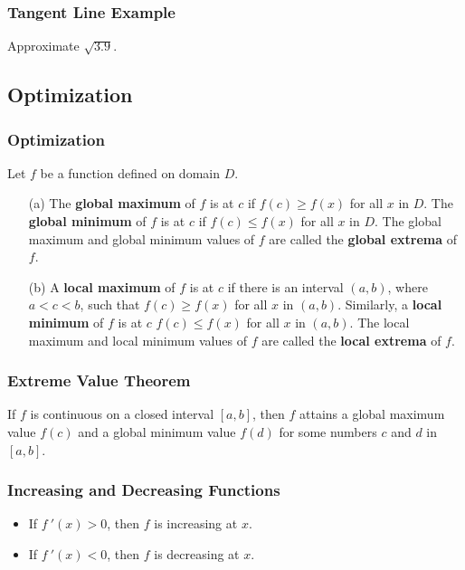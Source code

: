 \documentclass{beamer}
\begin{document}
\begin{frame}[t]
\frametitle{Tangent Line Example}
\begin{Example}
Approximate $\sqrt{3.9}$.
\end{Example}

\end{frame}


\subsection{Optimization}

\begin{frame}
\frametitle{Optimization}

\begin{Definition}
Let $f$ be a function defined on domain $D$.
\begin{enumerate}
\item[(a)] The {\bf global maximum} of $f$ is at $c$ if $f(c)\geq f(x)$ for all $x$ in $D$. The {\bf global minimum} of $f$ is at $c$ if $f(c) \leq f(x)$ for all $x$ in $D$. The global maximum and global minimum values of $f$ are called the {\bf global extrema} of $f$.
\item[(b)] A {\bf local maximum} of $f$ is at $c$ if there is an interval $(a, b)$, where $a < c < b$, such that $f(c) \geq f(x)$ for all $x$ in $(a, b)$. Similarly, a {\bf local minimum} of $f$ is at $c$ $f(c) \leq f(x)$ for all $x$ in $(a, b)$. The local maximum and local minimum values of $f$ are called the {\bf local extrema} of $f$.
\end{enumerate}
\end{Definition}
\end{frame}

\begin{frame}
\frametitle{Extreme Value Theorem}

\begin{Theorem}
If $f$ is continuous on a closed interval $[a, b]$, then $f$ attains a global maximum value $f(c)$ and a global minimum value $f(d)$ for some numbers $c$ and $d$ in $[a, b]$.
\end{Theorem}

\end{frame}

\begin{frame}[t]
\frametitle{Increasing and Decreasing Functions}

\begin{itemize}
\item If $f\ '(x) > 0 $, then $f$ is increasing at $x$.
\item If $f\ ' (x) < 0$, then $f$ is decreasing at $x$.
\end{itemize}

\end{frame}
\end{document}
